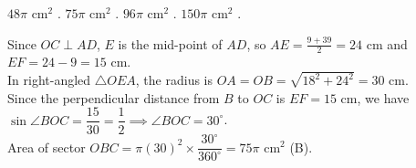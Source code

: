 \begin{minipage}{0.45\textwidth}
\begin{choices}
    \choice $48\pi\text{ cm}^2$ .
    \correctchoice $75\pi\text{ cm}^2$ .
    \choice $96\pi\text{ cm}^2$ .
    \choice $150\pi\text{ cm}^2$ .
\end{choices}
\end{minipage}
\begin{minipage}{0.52\textwidth}
\centering
{}
\end{minipage}
\begin{solution}
Since $OC \perp AD$, $E$ is the mid-point of $AD$, so $AE = \frac{9+39}{2} = 24\text{ cm}$ and $EF = 24 - 9 = 15\text{ cm}$. \\
In right-angled $\triangle OEA$, the radius is $OA = OB = \sqrt{18^2 + 24^2} = 30\text{ cm}$. \\
Since the perpendicular distance from $B$ to $OC$ is $EF = 15\text{ cm}$, we have $\sin\angle BOC = \dfrac{15}{30} = \dfrac{1}{2} \implies \angle BOC = 30^\circ$. \\
Area of sector $OBC = \pi(30)^2 \times \dfrac{30^\circ}{360^\circ} = 75\pi\text{ cm}^2$ (B).
\end{solution}